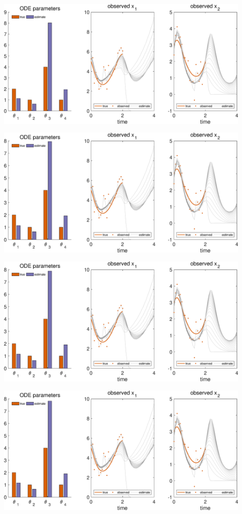 {\includegraphics [width=5in]{VGM_for_Lotka_Volterra_22.eps}

\includegraphics [width=5in]{VGM_for_Lotka_Volterra_23.eps}

\includegraphics [width=5in]{VGM_for_Lotka_Volterra_24.eps}

\includegraphics [width=5in]{VGM_for_Lotka_Volterra_25.eps}

}
